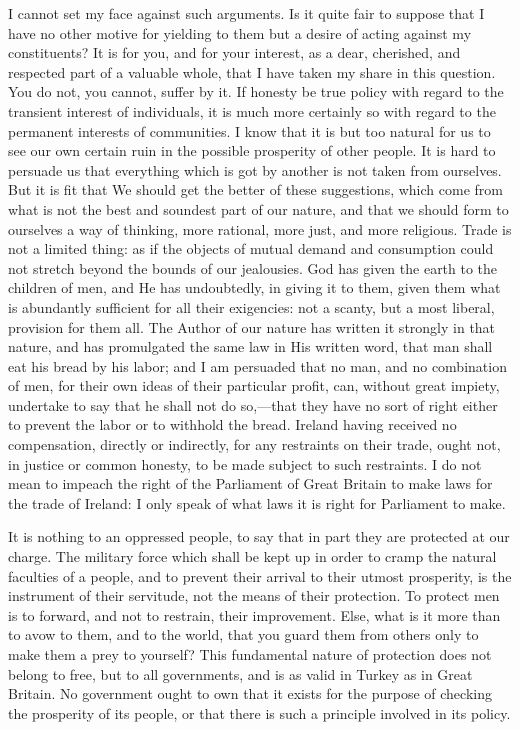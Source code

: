 I cannot set my face against such arguments. Is it quite fair to suppose that I have no other motive for yielding to them but a desire of acting against my constituents? It is for you, and for your interest, as a dear, cherished, and respected part of a valuable whole, that I have taken my share in this question. You do not, you cannot, suffer by it. If honesty be true policy with regard to the transient interest of individuals, it is much more certainly so with regard to the permanent interests of communities. I know that it is but too natural for us to see our own certain ruin in the possible prosperity of other people. It is hard to persuade us that everything which is got by another is not taken from ourselves. But it is fit that We should get the better of these suggestions, which come from what is not the best and soundest part of our nature, and that we should form to ourselves a way of thinking, more rational, more just, and more religious. Trade is not a limited thing: as if the objects of mutual demand and consumption could not stretch beyond the bounds of our jealousies. God has given the earth to the children of men, and He has undoubtedly, in giving it to them, given them what is abundantly sufficient for all their exigencies: not a scanty, but a most liberal, provision for them all. The Author of our nature has written it strongly in that nature, and has promulgated the same law in His written word, that man shall eat his bread by his labor; and I am persuaded that no man, and no combination of men, for their own ideas of their particular profit, can, without great impiety, undertake to say that he shall not do so,—that they have no sort of right either to prevent the labor or to withhold the bread. Ireland having received no compensation, directly or indirectly, for any restraints on their trade, ought not, in justice or common honesty, to be made subject to such restraints. I do not mean to impeach the right of the Parliament of Great Britain to make laws for the trade of Ireland: I only speak of what laws it is right for Parliament to make.

It is nothing to an oppressed people, to say that in part they are protected at our charge. The military force which shall be kept up in order to cramp the natural faculties of a people, and to prevent their arrival to their utmost prosperity, is the instrument of their servitude, not the means of their protection. To protect men is to forward, and not to restrain, their improvement. Else, what is it more than to avow to them, and to the world, that you guard them from others only to make them a prey to yourself? This fundamental nature of protection does not belong to free, but to all governments, and is as valid in Turkey as in Great Britain. No government ought to own that it exists for the purpose of checking the prosperity of its people, or that there is such a principle involved in its policy.

